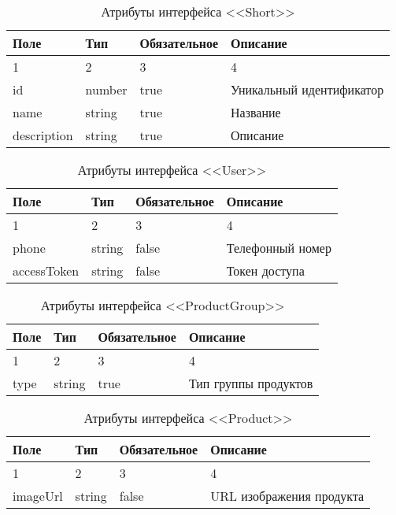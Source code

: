 \begin{xltabular}{\textwidth}{|l|l|p{1.7cm}|X|}
    \caption{Атрибуты интерфейса <<Short>>}\\ \hline
    Поле & Тип & Обяза\-тельное & Описание \\  & 2 & 3 & 4 \\ \hline
    id & number & true & Уникальный идентификатор \\ \hline
    name & string & true & Название \\ \hline
    description & string & true & Описание \\ \hline
\end{xltabular}

\begin{xltabular}{\textwidth}{|l|l|p{1.7cm}|X|}
    \caption{Атрибуты интерфейса <<User>>}\\ \hline
    Поле & Тип & Обяза\-тельное & Описание \\  & 2 & 3 & 4 \\ \hline
    phone & string & false & Телефонный номер \\ \hline
    accessToken & string & false & Токен доступа \\ \hline
\end{xltabular}

\vspace{\baselineskip}
\vspace{\baselineskip}
\vspace{\baselineskip}
\vspace{\baselineskip}
\vspace{\baselineskip}
\vspace{\baselineskip}
\vspace{\baselineskip}

\begin{xltabular}{\textwidth}{|l|l|p{1.7cm}|X|}
    \caption{Атрибуты интерфейса <<ProductGroup>>}\\ \hline
    Поле & Тип & Обяза\-тельное & Описание \\  & 2 & 3 & 4 \\ \hline
    type & string & true & Тип группы продуктов \\ \hline
\end{xltabular}

\begin{xltabular}{\textwidth}{|l|l|p{1.7cm}|X|}
    \caption{Атрибуты интерфейса <<Product>>}\\ \hline
    Поле & Тип & Обяза\-тельное & Описание \\  & 2 & 3 & 4 \\ \hline
    imageUrl & string & false & URL изображения продукта \\ \hline
\end{xltabular}

